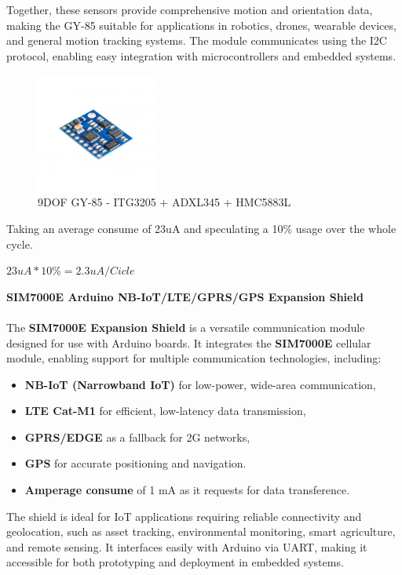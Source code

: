 Together, these sensors provide comprehensive motion and orientation data, 
making the GY-85 suitable for applications in robotics, drones, wearable 
devices, and general motion tracking systems. The module communicates using 
the I2C protocol, enabling easy integration with microcontrollers and 
embedded systems.

\begin{figure}[H]
    \centering
    \includegraphics[width=0.35\textwidth]{images/chapter/design/components/final_IMU.png}  %
    \caption{9DOF GY-85 - ITG3205 + ADXL345 + HMC5883L}
    \label{fig:9DOF GY-85 - ITG3205 + ADXL345 + HMC5883L}        
\end{figure}

Taking an average consume of 23uA and speculating a 10\% usage over the whole cycle.

\( 23uA * 10\% = 2.3uA/Cicle\)

\textbf{SIM7000E Arduino NB-IoT/LTE/GPRS/GPS Expansion Shield}
\\\\
The \textbf{SIM7000E Expansion Shield} is a versatile communication module designed for use with Arduino boards. It integrates the \textbf{SIM7000E} cellular module, enabling support for multiple communication technologies, including:

\begin{itemize}
    \item \textbf{NB-IoT (Narrowband IoT)} for low-power, wide-area communication,
    \item \textbf{LTE Cat-M1} for efficient, low-latency data transmission,
    \item \textbf{GPRS/EDGE} as a fallback for 2G networks,
    \item \textbf{GPS} for accurate positioning and navigation.
    \item \textbf{Amperage consume} of 1 mA as it requests for data transference.
\end{itemize}

The shield is ideal for IoT applications requiring reliable connectivity and 
geolocation, such as asset tracking, environmental monitoring, smart 
agriculture, and remote sensing. It interfaces easily with Arduino via UART, 
making it accessible for both prototyping and deployment in embedded systems.


